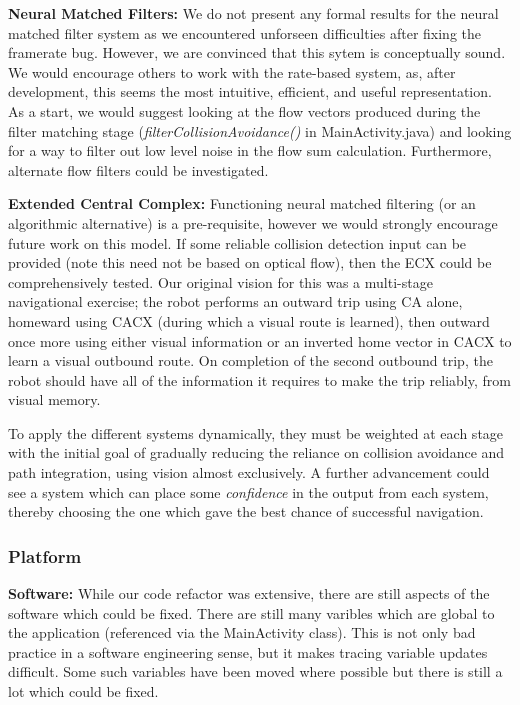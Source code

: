 \documentclass[a4paper,11pt,twoside,openright]{article}
\begin{document}
\textbf{Neural Matched Filters:} We do not present any formal results
for the neural matched filter system as we encountered unforseen
difficulties after fixing the framerate bug. However, we are convinced
that this sytem is conceptually sound. We would encourage others to
work with the rate-based system, as, after development, this seems the
most intuitive, efficient, and useful representation. As a start, we
would suggest looking at the flow vectors produced during the filter
matching stage (\textit{filterCollisionAvoidance()} in
MainActivity.java) and looking for a way to filter out low level
noise in the flow sum calculation. Furthermore, alternate flow filters
could be investigated.
\newline\par

\textbf{Extended Central Complex:} Functioning neural matched
filtering (or an algorithmic alternative) is a pre-requisite, however
we would strongly encourage future work on this model. If some
reliable collision detection input can be provided (note this need not
be based on optical flow), then the ECX could be comprehensively
tested. Our original vision for this was a multi-stage navigational
exercise; the robot performs an outward trip using CA alone, homeward
using CACX (during which a visual route is learned), then outward once
more using either visual information or an inverted home vector in
CACX to learn a visual outbound route. On completion of the second
outbound trip, the robot should have all of the information it
requires to make the trip reliably, from visual memory. \newline\par

To apply the different systems dynamically, they must be weighted at
each stage with the initial goal of gradually reducing the reliance on
collision avoidance and path integration, using vision almost
exclusively. A further advancement could see a system which can place
some \textit{confidence} in the output from each system, thereby
choosing the one which gave the best chance of successful navigation.
\newline\par

\subsubsection{Platform}\label{sec:disc:platform}
\textbf{Software:} While our code refactor was extensive, there are
still aspects of the software which could be fixed. There are still
many varibles which are global to the application (referenced via the
MainActivity class). This is not only bad practice in a software
engineering sense, but it makes tracing variable updates
difficult. Some such variables have been moved where possible but
there is still a lot which could be fixed.\newline\par
\end{document}
